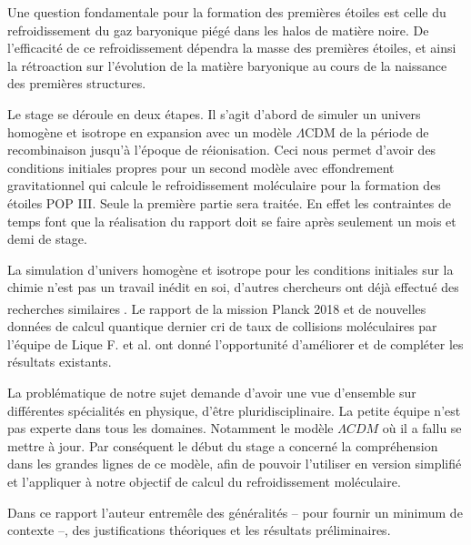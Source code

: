 \documentclass[10pt, a4paper]{report}
\numberwithin{equation}{subsection}
\begin{document}
Une question fondamentale pour la formation des premières étoiles est celle du refroidissement du gaz baryonique piégé dans les halos de matière noire. De l'efficacité de ce refroidissement dépendra la masse des premières étoiles, et ainsi la rétroaction sur l'évolution de la matière baryonique au cours de la naissance des premières structures. 

Le stage se déroule en deux étapes. Il s'agit d'abord de simuler un univers homogène et isotrope en expansion avec un modèle $\Lambda$CDM de la période de recombinaison jusqu'à l'époque de réionisation. Ceci nous permet d'avoir des conditions initiales propres pour un second modèle avec effondrement gravitationnel qui calcule le refroidissement moléculaire pour la formation des étoiles POP III. Seule la première partie sera traitée. En effet les contraintes de temps font que la réalisation du rapport doit se faire après seulement un mois et demi de stage.

La simulation d'univers homogène et isotrope pour les conditions initiales sur la chimie n'est pas un travail inédit en soi, d'autres chercheurs ont déjà effectué des recherches similaires\textsuperscript{\cite{Coppola} \cite{Flower}}. Le rapport de la mission Planck 2018\textsuperscript{\cite{Planck2018}} et de nouvelles données de calcul quantique dernier cri de taux de collisions moléculaires par l'équipe de Lique F. et al. ont donné l'opportunité d'améliorer et de compléter les résultats existants. 

La problématique de notre sujet demande d'avoir une vue d'ensemble sur différentes spécialités en physique, d'être pluridisciplinaire. La petite équipe n'est pas experte dans tous les domaines. Notamment le modèle $\Lambda CDM$ où il a fallu se mettre à jour. Par conséquent le début du stage a concerné la compréhension dans les grandes lignes de ce modèle, afin de pouvoir l'utiliser en version simplifié et l'appliquer à notre objectif de calcul du refroidissement moléculaire.

Dans ce rapport l'auteur entremêle des généralités -- pour fournir un minimum de contexte --, des justifications théoriques et les résultats préliminaires.
\end{document}
